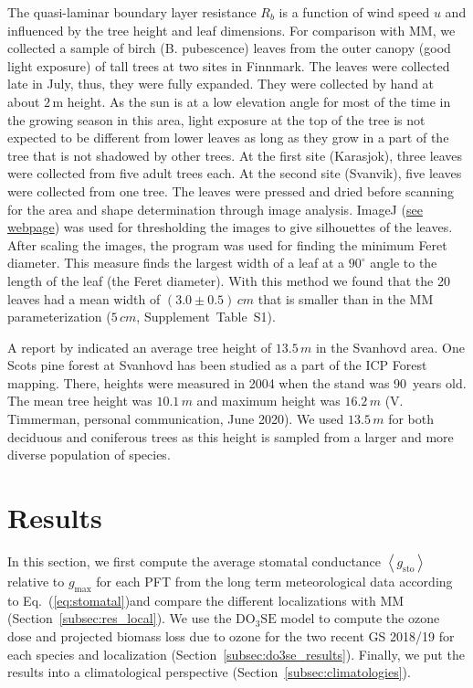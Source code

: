 \documentclass[bg, manuscript]{copernicus}
\begin{document}
The quasi-laminar boundary layer resistance $R_b$ is a function of wind speed $u$ and influenced by the tree height and leaf dimensions. For comparison with MM, we collected a sample of birch (B. pubescence) leaves from the outer canopy (good light exposure) of tall trees at two sites in Finnmark. The leaves were collected late in July, thus, they were fully expanded. They were collected by hand at about $2\,\mathrm{m}$ height. As the sun is at a low elevation angle for most of the time in the growing season in this area, light exposure at the top of the tree is not expected to be different from lower leaves as long as they grow in a part of the tree that is not shadowed by other trees. At the first site (Karasjok), three leaves were collected from five adult trees each. At the second site (Svanvik), five leaves were collected from one tree. The leaves were pressed and dried before scanning for the area and shape determination through image analysis. ImageJ (\href{https://imagej.nih.gov/ij/}{see webpage}) was used for thresholding the images to give silhouettes of the leaves. After scaling the images, the program was used for finding the minimum Feret diameter. This measure finds the largest width of a leaf at a $90^\circ$ angle to the length of the leaf (the Feret diameter). With this method we found that the 20 leaves had a mean width of $(3.0\pm 0.5)\,\unit{cm}$ that is smaller than in the MM parameterization ($5\,\unit{cm}$, Supplement~Table~S1). 

A report by \citet[][p.~52]{NINA2004} indicated an average tree height of $13.5\,\unit{m}$ in the Svanhovd area. One Scots pine forest at Svanhovd has been studied as a part of the ICP Forest mapping. There, heights were measured in 2004 when the stand was 90~years old. The mean tree height was $10.1\,\unit{m}$ and maximum height was $16.2\,\unit{m}$ (V. Timmerman, personal communication, June 2020). We used $13.5\,\unit{m}$ for both deciduous and coniferous trees as this height is sampled from a larger and more diverse population of species.

\section{Results}
\label{sec:results}
In this section, we first compute the average stomatal conductance $\left<g_\mathrm{sto}\right>$ relative to $g_\mathrm{max}$ for each PFT from the long term meteorological data according to Eq.~(\ref{eq:stomatal})and compare the different localizations with MM (Section~\ref{subsec:res_local}). We use the $\mathrm{DO_3SE}$ model to compute the ozone dose and projected biomass loss due to ozone for the two recent GS 2018/19 for each species and localization (Section~\ref{subsec:do3se_results}). Finally, we put the results into a climatological perspective (Section~\ref{subsec:climatologies}).  
\end{document}
